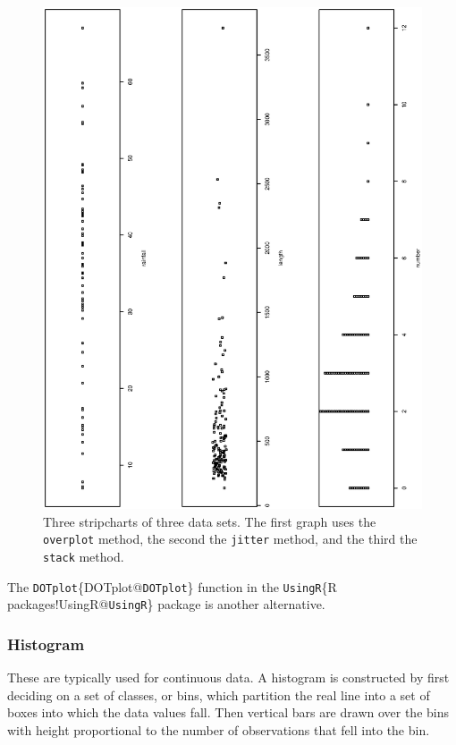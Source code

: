 \documentclass[10pt,english]{scrbook}
\begin{document}
\begin{figure}[th]
  \includegraphics[angle=270, totalheight=4in]{ps/datadesc/stripcharts.ps}
  \caption[Strip charts of \texttt{precip}, \texttt{rivers}, and \texttt{discoveries}]{\small Three stripcharts of three data sets.  The first graph uses the \texttt{overplot} method, the second the \texttt{jitter} method, and the third the \texttt{stack} method.}
  \label{fig-stripcharts}
\end{figure}


The \texttt{DOTplot}\index\{DOTplot@\texttt{DOTplot}\} function in the \texttt{UsingR}\index\{R packages!UsingR@\texttt{UsingR}\} package \cite{UsingR} is another alternative.
\subsubsection[Histogram\index{Histogram}]{Histogram}
\label{sec-1-1-2-2}

These are typically used for continuous data. A histogram is constructed by first deciding on a set of classes, or bins, which partition the real line into a set of boxes into which the data values fall. Then vertical bars are drawn over the bins with height proportional to the number of observations that fell into the bin. 
\end{document}
